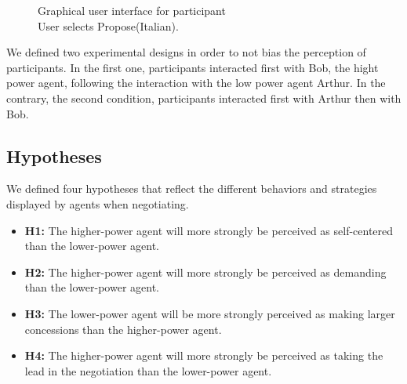 \documentclass[runningheads,a4paper]{llncs}
\begin{document}
		\begin{figure}[t]
			\centering
			\caption{Graphical user interface for participant
				\\ User selects Propose(Italian).}
			\label{ihm}
		\end{figure}
		
		We defined two experimental designs in order to not bias the perception of participants. In the first one, participants interacted first with Bob, the hight power agent, following the interaction with the low power agent Arthur. In the contrary, the second condition, participants interacted first with Arthur then with Bob. 
		
		\subsection{Hypotheses}
			We defined four hypotheses that reflect the different behaviors and strategies displayed by agents when negotiating.
			
			\begin{itemize}
					\item  \textbf{H1:} The higher-power agent will more strongly be perceived as self-centered than the lower-power agent.  
					
					\item \textbf{H2:}  The higher-power agent will more strongly be perceived as demanding than the lower-power agent.
										
					\item \textbf{H3:} The lower-power agent will be more strongly perceived as making larger concessions than the higher-power agent.
					
					\item \textbf{H4:}  The higher-power agent will more strongly be perceived as taking the lead in the negotiation than the lower-power agent.
					
				\end{itemize}
				
\end{document}

